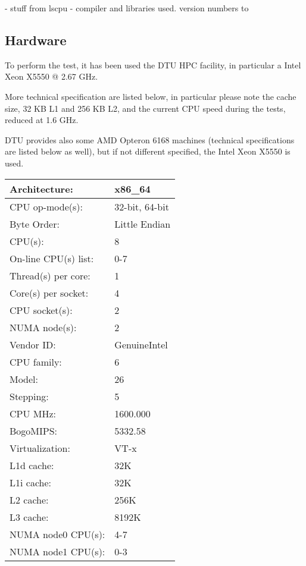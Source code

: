  - stuff from lscpu
 - compiler and libraries used. version numbers to

\subsection{Hardware} 
 
To perform the test, it has been used the DTU HPC facility, in particular a Intel Xeon X5550 @ 2.67 GHz.

More technical specification are listed below, in particular please note the cache size, 32 KB L1 and 256 KB L2, and the current CPU speed during the tests, reduced at 1.6 GHz.

DTU provides also some AMD Opteron 6168 machines (technical specifications are listed below as well), but if not different specified, the Intel Xeon X5550 is used.
 
\begin{tabular}{ l l }
\hline
Architecture:          & x86\_64\\ \hline
CPU op-mode(s):        & 32-bit, 64-bit\\ \hline
Byte Order:            & Little Endian\\ \hline
CPU(s):                & 8\\ \hline
On-line CPU(s) list:   & 0-7\\ \hline
Thread(s) per core:    & 1\\ \hline
Core(s) per socket:    & 4\\ \hline
CPU socket(s):         & 2\\ \hline
NUMA node(s):          & 2\\ \hline
Vendor ID:             & GenuineIntel\\ \hline
CPU family:            & 6\\ \hline
Model:                 & 26\\ \hline
Stepping:              & 5\\ \hline
CPU MHz:               & 1600.000\\ \hline
BogoMIPS:              & 5332.58\\ \hline
Virtualization:        & VT-x\\ \hline
L1d cache:             & 32K\\ \hline
L1i cache:             & 32K\\ \hline
L2 cache:              & 256K\\ \hline
L3 cache:              & 8192K\\ \hline
NUMA node0 CPU(s):     & 4-7\\ \hline
NUMA node1 CPU(s):     & 0-3\\ \hline
\end{tabular}

